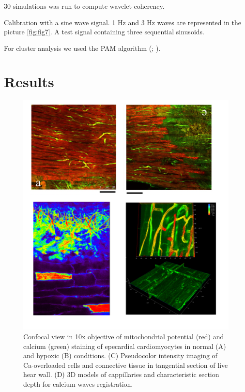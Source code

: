 \documentclass{biophys-new}
\begin{document}
30 simulations was run to compute wavelet coherency.

Calibration with a sine wave signal.
1 Hz and 3 Hz waves are represented in the picture \ref{fig:fig7}.
A test signal containing three sequential sinusoids.



For cluster analysis we used the PAM algorithm (\cite{kaufman2009finding}; \cite{kassambara2017practical}).


\section*{Results}



\begin{figure}[hbt!]
\centering
\includegraphics[width=0.8\linewidth]{fig1.png}
\caption{Confocal view in 10x objective of mitochondrial potential (red) and calcium (green) staining of epecardial cardiomyocytes in normal (A) and hypoxic (B) conditions. (C) Pseudocolor intensity imaging of Ca-overloaded cells and connective tissue in  tangential section of live hear wall. (D) 3D models of  cappillaries and characteristic section depth for calcium waves registration.}
\label{fig:fig1}
\end{figure}
\end{document}
